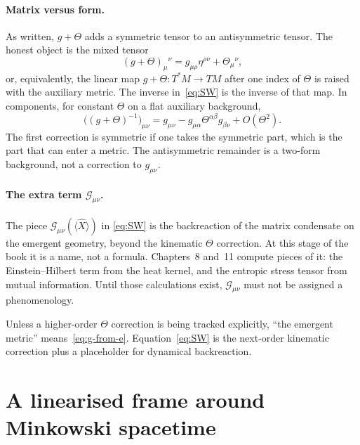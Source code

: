 \paragraph{Matrix versus form.}
As written, \(g+\Theta\) adds a symmetric tensor to an antisymmetric
tensor. The honest object is the mixed tensor
\begin{equation}
  \label{eq:g-plus-Theta}
  (g+\Theta)_{\mu}{}^{\nu}
  =g_{\mu\rho}\eta^{\rho\nu}+\Theta_{\mu}{}^{\nu},
\end{equation}
or, equivalently, the linear map \(g+\Theta:T^*M\to TM\) after one
index of \(\Theta\) is raised with the auxiliary metric. The inverse
in~\eqref{eq:SW} is the inverse of that map. In components, for
constant \(\Theta\) on a flat auxiliary background,
\begin{equation}
  \label{eq:SW-flat}
  \bigl((g+\Theta)^{-1}\bigr)_{\mu\nu}
  =g_{\mu\nu}
   -g_{\mu\alpha}\Theta^{\alpha\beta}g_{\beta\nu}
   +O(\Theta^2).
\end{equation}
The first correction is symmetric if one takes the symmetric part,
which is the part that can enter a metric. The antisymmetric remainder
is a two-form background, not a correction to \(g_{\mu\nu}\).

\paragraph{The extra term \(\mathcal{G}_{\mu\nu}\).}
The piece \(\mathcal{G}_{\mu\nu}(\langle\hat X\rangle)\) in
\eqref{eq:SW} is the backreaction of the matrix condensate on the
emergent geometry, beyond the kinematic \(\Theta\) correction. At
this stage of the book it is a name, not a formula. Chapters~8
and~11 compute pieces of it: the Einstein--Hilbert term from the
heat kernel, and the entropic stress tensor from mutual information.
Until those calculations exist, \(\mathcal{G}_{\mu\nu}\) must not be
assigned a phenomenology.

\begin{definition}
  \label{def:working-metric}
  Unless a higher-order \(\Theta\) correction is being tracked
  explicitly, ``the emergent metric'' means~\eqref{eq:g-from-e}.
  Equation~\eqref{eq:SW} is the next-order kinematic correction
  plus a placeholder for dynamical backreaction.
\end{definition}

\section{A linearised frame around Minkowski spacetime}
\label{sec:ch4-minkowski}

